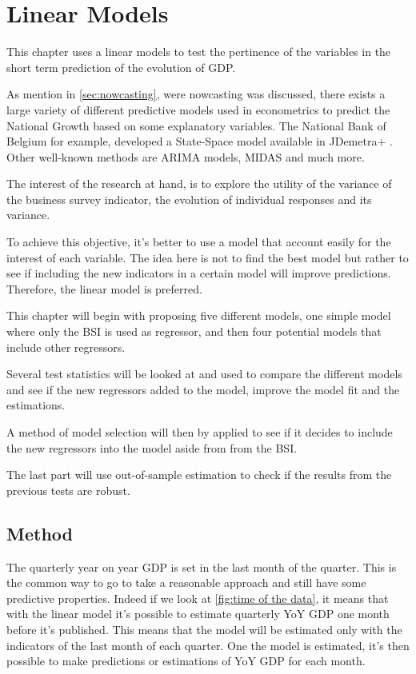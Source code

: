 \documentclass[12pt,a4paper,oneside]{book}
\begin{document}
\chapter{Linear Models}

This chapter uses a linear models to test the pertinence of the variables in the short term prediction of the evolution of GDP.

As mention in \autoref{sec:nowcasting}, were nowcasting was discussed, there exists a large variety of different predictive models used in econometrics to predict the National Growth based on some explanatory variables.
The National Bank of Belgium for example, developed a State-Space model available in JDemetra+ \cite{de_antonio_liedo_nowcasting_2014}. Other well-known methods are ARIMA models, MIDAS and much more.

The interest of the research at hand, is to explore the utility of the variance of the business survey indicator, the evolution of individual responses and its variance.

To achieve this objective, it's better to use a model that account easily for the interest of each variable. The idea here is not to find the best model but rather to see if including the new indicators in a certain model will improve predictions.
Therefore, the linear model is preferred.

This chapter will begin with proposing five different models, one simple model where only the BSI is used as regressor, and then four potential models that include other regressors.

Several test statistics will be looked at and used to compare the different models and see if the new regressors added to the model, improve the model fit and the estimations.

A method of model selection will then by applied to see if it decides to include the new regressors into the model aside from from the BSI.

The last part will use out-of-sample estimation to check if the results from the previous tests are robust.

\section{Method}

The quarterly year on year GDP is set in the last month of the quarter. This is the common way to go to take a reasonable approach and still have some predictive properties.
Indeed if we look at \autoref{fig:time of the data}, it means that with the linear model it's possible to estimate quarterly YoY GDP one month before it's published. 
This means that the model will be estimated only with the indicators of the last month of each quarter. One the model is estimated, it's then possible to make predictions or estimations of YoY GDP for each month.
\end{document}
